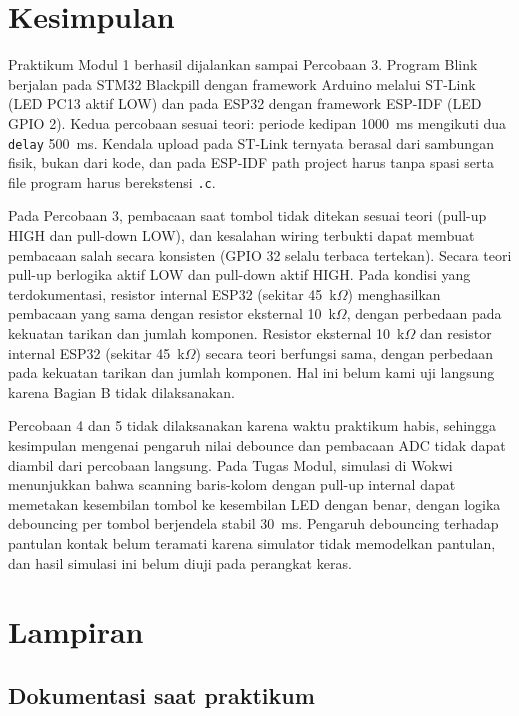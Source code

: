 \section{Kesimpulan}
Praktikum Modul 1 berhasil dijalankan sampai Percobaan 3. Program Blink berjalan pada STM32 Blackpill dengan framework Arduino melalui ST-Link (LED PC13 aktif LOW) dan pada ESP32 dengan framework ESP-IDF (LED GPIO 2). Kedua percobaan sesuai teori: periode kedipan 1000~ms mengikuti dua \texttt{delay} 500~ms. Kendala upload pada ST-Link ternyata berasal dari sambungan fisik, bukan dari kode, dan pada ESP-IDF path project harus tanpa spasi serta file program harus berekstensi \texttt{.c}.

Pada Percobaan 3, pembacaan saat tombol tidak ditekan sesuai teori (pull-up HIGH dan pull-down LOW), dan kesalahan wiring terbukti dapat membuat pembacaan salah secara konsisten (GPIO 32 selalu terbaca tertekan). Secara teori pull-up berlogika aktif LOW dan pull-down aktif HIGH.
\ifBagianB
Pada kondisi yang terdokumentasi, resistor internal ESP32 (sekitar 45~k$\Omega$) menghasilkan pembacaan yang sama dengan resistor eksternal 10~k$\Omega$, dengan perbedaan pada kekuatan tarikan dan jumlah komponen.
\else
Resistor eksternal 10~k$\Omega$ dan resistor internal ESP32 (sekitar 45~k$\Omega$) secara teori berfungsi sama, dengan perbedaan pada kekuatan tarikan dan jumlah komponen. Hal ini belum kami uji langsung karena Bagian B tidak dilaksanakan.
\fi

Percobaan 4 dan 5 tidak dilaksanakan karena waktu praktikum habis, sehingga kesimpulan mengenai pengaruh nilai debounce dan pembacaan ADC tidak dapat diambil dari percobaan langsung. Pada Tugas Modul, simulasi di Wokwi menunjukkan bahwa scanning baris-kolom dengan pull-up internal dapat memetakan kesembilan tombol ke kesembilan LED dengan benar, dengan logika debouncing per tombol berjendela stabil 30~ms. Pengaruh debouncing terhadap pantulan kontak belum teramati karena simulator tidak memodelkan pantulan, dan hasil simulasi ini belum diuji pada perangkat keras.

\section{Lampiran}
\subsection{Dokumentasi saat praktikum}
\ifShowMissing\else
{}
\fi
